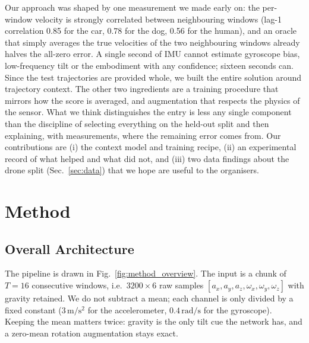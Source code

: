 \documentclass[letterpaper,10pt,conference]{ieeeconf}
\begin{document}
Our approach was shaped by one measurement we made early on: the per-window velocity is strongly correlated between
neighbouring windows (lag-1 correlation 0.85 for the car, 0.78 for the dog, 0.56 for the human), and an oracle that
simply averages the true velocities of the two neighbouring windows already halves the all-zero error. A single
second of IMU cannot estimate gyroscope bias, low-frequency tilt or the embodiment with any confidence; sixteen
seconds can. Since the test trajectories are provided whole, we built the entire solution around trajectory context.
The other two ingredients are a training procedure that mirrors how the score is averaged, and augmentation that
respects the physics of the sensor. What we think distinguishes the entry is less any single component than the
discipline of selecting everything on the held-out split and then explaining, with measurements, where the remaining
error comes from. Our contributions are (i) the context model and training recipe, (ii) an experimental record of
what helped and what did not, and (iii) two data findings about the drone split (Sec.~\ref{sec:data}) that we hope
are useful to the organisers.

\section{Method}
\subsection{Overall Architecture}
The pipeline is drawn in Fig.~\ref{fig:method_overview}. The input is a chunk of $T{=}16$ consecutive windows, i.e.\
$3200\times 6$ raw samples $[a_x,a_y,a_z,\omega_x,\omega_y,\omega_z]$ with gravity retained. We do not subtract a
mean; each channel is only divided by a fixed constant ($3\,\mathrm{m/s^2}$ for the accelerometer,
$0.4\,\mathrm{rad/s}$ for the gyroscope). Keeping the mean matters twice: gravity is the only tilt cue the network
has, and a zero-mean rotation augmentation stays exact.
\end{document}
